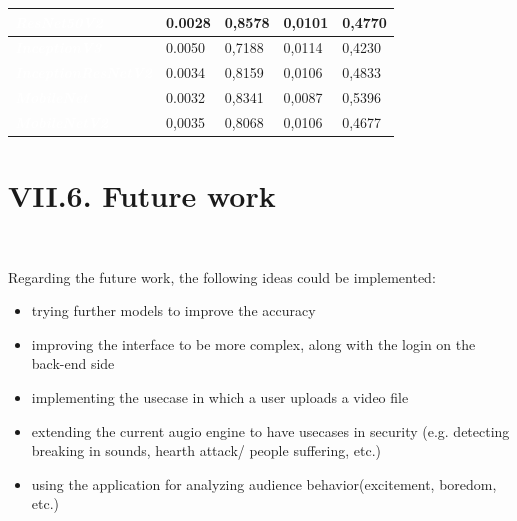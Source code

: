 \documentclass[11pt, a4papper]{report}
\theoremstyle{plain}
\theoremstyle{definition}
\theoremstyle{definition}
\theoremstyle{proposition}
\begin{document}
\begin{center}
\begin{footnotesize}
\begin{tabular}{ | M{4.6cm} | m{2cm} | m{2cm} |m{2cm} | m{2cm}}
\textit{\textbf{\textcolor{white}{ResNet50V2}}}&   {0.0028} &   {0,8578} 
&   {0,0101} 
&   {0,4770}  \\
\hline
{}
\textit{\textbf{\textcolor{white}{InceptionV3}}}&   {0.0050} &   {0,7188} 
&   {0,0114} 
&   {0,4230}  \\
\hline
{}
\textit{\textbf{\textcolor{white}{InceptionResNetV2}}}&   {0.0034} &   {0,8159} 
&   {0,0106} 
&   {0,4833}  \\
\hline
{}
\textit{\textbf{\textcolor{white}{MobileNet}}}&   {0.0032} &   {0,8341} 
&   {0,0087} 
&   {0,5396}  \\
\hline
{}
\textit{\textbf{\textcolor{white}{MobileNetV2}}}&   {0,0035} &   {0,8068} 
&   {0,0106} 
&   {0,4677}  \\
\hline
\end{tabular}
\end{footnotesize}
\end{center}

\section*{VII.6. Future work}
\

Regarding the future work, the following ideas could be implemented:
\begin{itemize}
\item trying further models to improve the accuracy
\item improving the interface to be more complex, along with the login on the back-end side
\item implementing the usecase in which a user uploads a video file
\item extending the current augio engine to have usecases in security (e.g. detecting breaking in sounds, hearth attack/ people suffering, etc.)
\item using the application for analyzing audience behavior(excitement, boredom, etc.)
\end{itemize}
\end{document}
